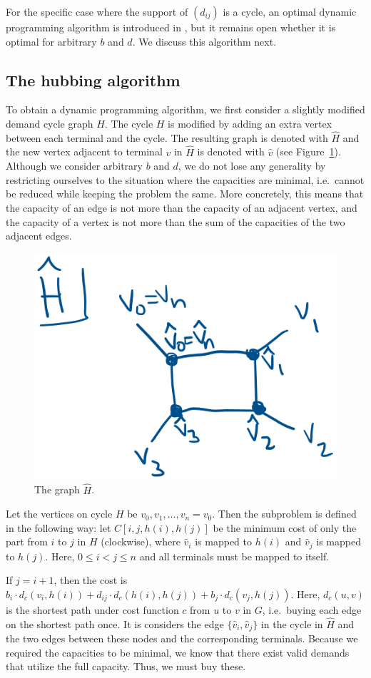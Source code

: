 For the specific case where the support of $(d_{ij})$ is a cycle, an optimal dynamic programming algorithm is introduced in \cite{bosman2017exploring}, but it remains open whether it is optimal for arbitrary $b$ and $d$.
We discuss this algorithm next.

\subsection{The hubbing algorithm}
To obtain a dynamic programming algorithm, we first consider a slightly modified demand cycle graph $H$.
The cycle $H$ is modified by adding an extra vertex between each terminal and the cycle.
The resulting graph is denoted with $\hat H$ and the new vertex adjacent to terminal $v$ in $\hat H$ is denoted with $\hat v$ (see Figure~\ref{fig:hdak}).
Although we consider arbitrary $b$ and $d$, we do not lose any generality by restricting ourselves to the situation where the capacities are minimal, i.e.\ cannot be reduced while keeping the problem the same.
More concretely, this means that the capacity of an edge is not more than the capacity of an adjacent vertex, and the capacity of a vertex is not more than the sum of the capacities of the two adjacent edges.

\begin{figure}
    \centering
    \includegraphics[width=.35\textwidth]{hdak.png}
    \caption{The graph $\hat H$.} \label{fig:hdak}
\end{figure}

Let the vertices on cycle $H$ be $v_0, v_1, \dots, v_n = v_0$.
Then the subproblem is defined in the following way: let $C[i, j, h(i), h(j)]$ be the minimum cost of only the part from $i$ to $j$ in $H$ (clockwise), where $\hat v_i$ is mapped to $h(i)$ and $\hat v_j$ is mapped to $h(j)$.
Here, $0 \le i < j \le n$ and all terminals must be mapped to itself.

If $j = i + 1$, then the cost is $b_i \cdot d_c(v_i, h(i)) + d_{ij} \cdot d_c(h(i), h(j)) + b_j \cdot d_c(v_j, h(j))$.
Here, $d_c(u, v)$ is the shortest path under cost function $c$ from $u$ to $v$ in $G$, i.e.\ buying each edge on the shortest path once.
It is considers the edge $\{\hat v_i, \hat v_j\}$ in the cycle in $\hat H$ and the two edges between these nodes and the corresponding terminals.
Because we required the capacities to be minimal, we know that there exist valid demands that utilize the full capacity.
Thus, we must buy these.

